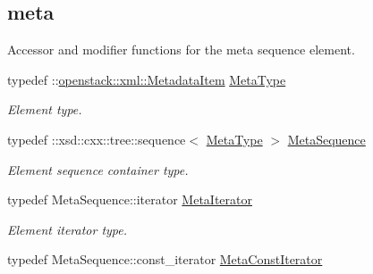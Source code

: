 \subsection*{meta}
\label{_amgrpe9a23cbc455158951716b440c3d165e0}
Accessor and modifier functions for the meta sequence element. \begin{DoxyCompactItemize}
\item 
\hypertarget{classopenstack_1_1xml_1_1Metadata_a63c7eb0e741e104dab8a0ea1d903266f}{
typedef ::\hyperlink{classopenstack_1_1xml_1_1MetadataItem}{openstack::xml::MetadataItem} \hyperlink{classopenstack_1_1xml_1_1Metadata_a63c7eb0e741e104dab8a0ea1d903266f}{MetaType}}
\label{classopenstack_1_1xml_1_1Metadata_a63c7eb0e741e104dab8a0ea1d903266f}

\begin{DoxyCompactList}\small\item\em Element type. \item\end{DoxyCompactList}\item 
\hypertarget{classopenstack_1_1xml_1_1Metadata_a625af6c431b37f4669b9526fea99ecfd}{
typedef ::xsd::cxx::tree::sequence$<$ \hyperlink{classopenstack_1_1xml_1_1MetadataItem}{MetaType} $>$ \hyperlink{classopenstack_1_1xml_1_1Metadata_a625af6c431b37f4669b9526fea99ecfd}{MetaSequence}}
\label{classopenstack_1_1xml_1_1Metadata_a625af6c431b37f4669b9526fea99ecfd}

\begin{DoxyCompactList}\small\item\em Element sequence container type. \item\end{DoxyCompactList}\item 
\hypertarget{classopenstack_1_1xml_1_1Metadata_a4d16d087e44621e80c2e8ec80ea2cec9}{
typedef MetaSequence::iterator \hyperlink{classopenstack_1_1xml_1_1Metadata_a4d16d087e44621e80c2e8ec80ea2cec9}{MetaIterator}}
\label{classopenstack_1_1xml_1_1Metadata_a4d16d087e44621e80c2e8ec80ea2cec9}

\begin{DoxyCompactList}\small\item\em Element iterator type. \item\end{DoxyCompactList}\item 
\hypertarget{classopenstack_1_1xml_1_1Metadata_a37ad62436969a68202b3e2fd27806b2e}{
typedef MetaSequence::const\_\-iterator \hyperlink{classopenstack_1_1xml_1_1Metadata_a37ad62436969a68202b3e2fd27806b2e}{MetaConstIterator}}
\label{classopenstack_1_1xml_1_1Metadata_a37ad62436969a68202b3e2fd27806b2e}


\end{DoxyCompactItemize}
